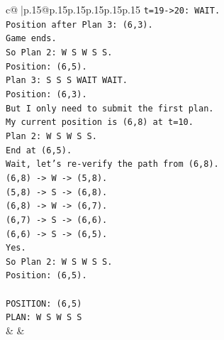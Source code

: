 \documentclass{article}
\begin{document}
{\begin{supertabular}{c@{$\;$}|p{.15\linewidth}@{}p{.15\linewidth}p{.15\linewidth}p{.15\linewidth}p{.15\linewidth}p{.15\linewidth}}
{{{\texttt{t=19{-}>20: WAIT.} \\
\texttt{Position after Plan 3: (6,3).} \\
\texttt{Game ends.} \\
\texttt{So Plan 2: W S W S S.} \\
\texttt{Position: (6,5).} \\
\texttt{Plan 3: S S S WAIT WAIT.} \\
\texttt{Position: (6,3).} \\
\texttt{But I only need to submit the first plan.} \\
\texttt{My current position is (6,8) at t=10.} \\
\texttt{Plan 2: W S W S S.} \\
\texttt{End at (6,5).} \\
\texttt{Wait, let's re{-}verify the path from (6,8).} \\
\texttt{(6,8) {-}> W {-}> (5,8).} \\
\texttt{(5,8) {-}> S {-}> (6,8).} \\
\texttt{(6,8) {-}> W {-}> (6,7).} \\
\texttt{(6,7) {-}> S {-}> (6,6).} \\
\texttt{(6,6) {-}> S {-}> (6,5).} \\
\texttt{Yes.} \\
\texttt{So Plan 2: W S W S S.} \\
\texttt{Position: (6,5).} \\
\\ 
\texttt{POSITION: (6,5)} \\
\texttt{PLAN: W S W S S} \\
            }
        }
    }
    & & \\ \\


\end{supertabular}}
\end{document}
